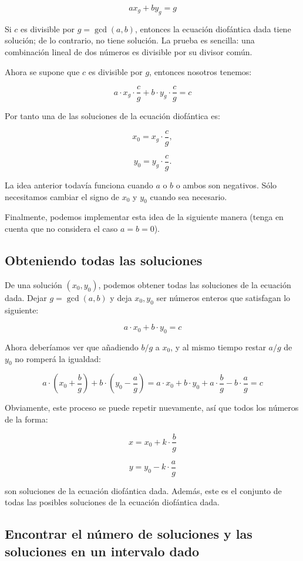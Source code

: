 $$a x_g + b y_g =g$$

Si $c$ es divisible por $g = \gcd(a, b)$, entonces la ecuación diofántica dada tiene solución; de lo contrario, no tiene solución. La prueba es sencilla: una combinación lineal de dos números es divisible por su divisor común.

Ahora se supone que $c$ es divisible por $g$, entonces nosotros tenemos:

$$a \cdot x_g \cdot \frac{c}{g} + b \cdot y_g \cdot \frac{c}{g} = c$$

Por tanto una de las soluciones de la ecuación diofántica es:

$$x_0 = x_g \cdot \frac{c}{g},$$

$$y_0 = y_g \cdot \frac{c}{g}.$$

La idea anterior todavía funciona cuando $a$ o $b$ o ambos son negativos. Sólo necesitamos cambiar el signo de $x_0$ y $y_0$ cuando sea necesario.

Finalmente, podemos implementar esta idea de la siguiente manera (tenga en cuenta que no considera el caso $a = b = 0$).

\subsection{Obteniendo todas las soluciones}

De una solución $(x_0, y_0)$, podemos obtener todas las soluciones de la ecuación dada. Dejar $g = \gcd(a, b)$ y deja $x_0, y_0$ ser números enteros que satisfagan lo siguiente:

$$a \cdot x_0 + b \cdot y_0 = c$$

Ahora deberíamos ver que añadiendo $b/g$ a $x_0$, y al mismo tiempo restar $a/g$ de $y_0$ no romperá la igualdad:

$$a \cdot \left(x_0 + \frac{b}{g}\right) + b \cdot \left(y_0 - \frac{a}{g}\right) = a \cdot x_0 + b \cdot y_0 + a \cdot \frac{b}{g} - b \cdot \frac{a}{g} = c$$

Obviamente, este proceso se puede repetir nuevamente, así que todos los números de la forma:

$$x = x_0 + k \cdot \frac{b}{g}$$

$$y = y_0 - k \cdot \frac{a}{g}$$

son soluciones de la ecuación diofántica dada. Además, este es el conjunto de todas las posibles soluciones de la ecuación diofántica dada.

\subsection{Encontrar el número de soluciones y las soluciones en un intervalo dado}

